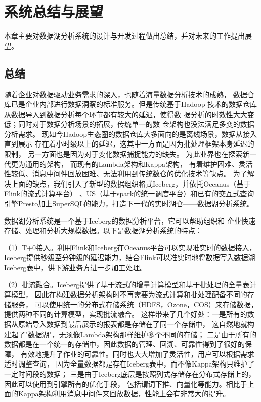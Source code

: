 
\chapter{系统总结与展望}

本章主要对数据湖分析系统的设计与开发过程做出总结，并对未来的工作提出展望。

\section{总结}

随着企业对数据驱动业务需求的深入，也随着海量数据分析技术的成熟，
数据仓库已是企业内部进行数据洞察的标准服务。但是传统基于Hadoop
技术的数据仓库从数据导入到数据分析每个环节都有较大的延迟，使得数
据分析的时效性大大变低；同时对于数据分析场景的拓展，传统单一的数
仓架构也没法满足多变的数据分析需求。
现如今Hadoop生态圈的数据仓库大多面向的是离线场景，数据从接入直到展示
存在着小时级以上的延迟，这其中一方面是因为批处理框架本身延迟的限制，
另一方面也是因为对于变化数据捕捉能力的缺失。
为此业界也在探索新一代更为通用的架构，
而现有的Lambda架构和Kappa架构，
有着维护困难、灵活性较低、消息中间件回放困难、无法利用到传统数仓的优化技术等缺点。
为了解决上面的缺点，我们引入了新型的数据组织格式Iceberg，并依托Oceanus（基于Flink的流式计算平台）
、US（基于spark的统一调度平台）和已有的交互式查询引擎Presto加上SuperSQL的能力，打造下一代的实时湖仓——数据湖分析系统。

数据湖分析系统是一个基于Iceberg的数据分析平台，它可以帮助组织和
企业快速存储、处理和分析大规模数据。以下是数据湖分析系统的特点：

（1）T+0接入。利用Flink和Iceberg在Oceanus平台可以实现准实时的数据接入，
Iceberg提供秒级至分钟级的延迟能力，结合Flink可以准实时地将数据写入数据湖Iceberg表中，供下游业务方进一步加工处理。

（2）批流融合。Iceberg提供了基于流式的增量计算模型和基于批处理的全量表计算模型，
因此在构建数据分析架构时不再需要为流式计算和批处理配备不同的存储服务，
可以使用统一的分布式存储系统（HDFS，Ozone，COS）来存储数据，提供两种不同的计算模型，实现批流融合。
这样带来了几个好处：一是所有的数据从原始导入数据到最后展示的报表都是存储在了同一个存储中，
这自然地就构建起了"数据湖"，无须像Lambda架构那样维护多个不同的存储；
二是由于所有的数据都是在一个统一的存储中，因此数据的管理、回溯、可靠性得到了很好的保障，
有效地提升了作业的可靠性。同时也大大增加了灵活性，用户可以根据需求适时调整查询，
因为全量数据都是存在Iceberg表中，而不像Kappa架构只维护了一定时间段的数据；
三是由于Iceberg底层是按照列式存储存在分布式存储上的，因此可以使用到引擎所有的优化手段，
包括谓词下推、向量化等能力。相比于上面的Kappa架构利用消息中间件来回放数据，性能上会有非常大的提升。

